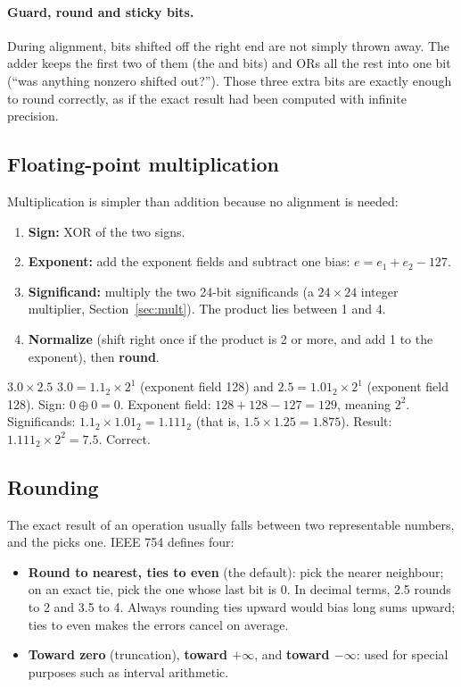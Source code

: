 \paragraph{Guard, round and sticky bits.} During alignment, bits shifted off the right end are not simply thrown away. The adder keeps the first two of them (the  and  bits) and ORs all the rest into one  bit (``was anything nonzero shifted out?''). Those three extra bits are exactly enough to round correctly, as if the exact result had been computed with infinite precision.

\subsection*{Floating-point multiplication}

Multiplication is simpler than addition because no alignment is needed:
\begin{enumerate}
  \item \textbf{Sign:} XOR of the two signs.
  \item \textbf{Exponent:} add the exponent fields and subtract one bias: $e = e_1 + e_2 - 127$.
  \item \textbf{Significand:} multiply the two 24-bit significands (a $24 \times 24$ integer multiplier, Section~\ref{sec:mult}). The product lies between 1 and 4.
  \item \textbf{Normalize} (shift right once if the product is 2 or more, and add 1 to the exponent), then \textbf{round}.
\end{enumerate}

\begin{worked}{$3.0 \times 2.5$}
$3.0 = 1.1_2 \times 2^1$ (exponent field 128) and $2.5 = 1.01_2 \times 2^1$ (exponent field 128). Sign: $0 \oplus 0 = 0$. Exponent field: $128 + 128 - 127 = 129$, meaning $2^2$. Significands: $1.1_2 \times 1.01_2 = 1.111_2$ (that is, $1.5 \times 1.25 = 1.875$). Result: $1.111_2 \times 2^2 = 7.5$. Correct.
\end{worked}

\subsection*{Rounding}

The exact result of an operation usually falls between two representable numbers, and the  picks one. IEEE 754 defines four:
\begin{itemize}
  \item \textbf{Round to nearest, ties to even} (the default): pick the nearer neighbour; on an exact tie, pick the one whose last bit is 0. In decimal terms, 2.5 rounds to 2 and 3.5 to 4. Always rounding ties upward would bias long sums upward; ties to even makes the errors cancel on average.
  \item \textbf{Toward zero} (truncation), \textbf{toward $+\infty$}, and \textbf{toward $-\infty$}: used for special purposes such as interval arithmetic.
\end{itemize}

